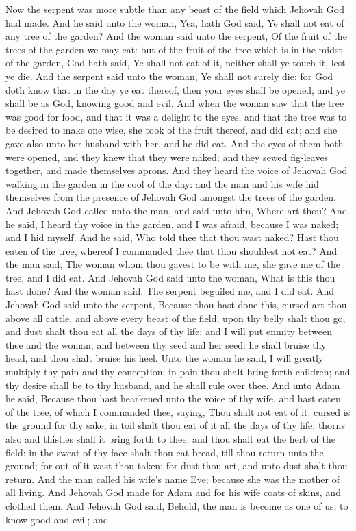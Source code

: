 Now the serpent was more subtle than any beast of the field which Jehovah God had made. And he said unto the woman, Yea, hath God said, Ye shall not eat of any tree of the garden? And the woman said unto the serpent, Of the fruit of the trees of the garden we may eat: but of the fruit of the tree which is in the midst of the garden, God hath said, Ye shall not eat of it, neither shall ye touch it, lest ye die. And the serpent said unto the woman, Ye shall not surely die: for God doth know that in the day ye eat thereof, then your eyes shall be opened, and ye shall be as God, knowing good and evil. And when the woman saw that the tree was good for food, and that it was a delight to the eyes, and that the tree was to be desired to make one wise, she took of the fruit thereof, and did eat; and she gave also unto her husband with her, and he did eat. And the eyes of them both were opened, and they knew that they were naked; and they sewed fig-leaves together, and made themselves aprons. And they heard the voice of Jehovah God walking in the garden in the cool of the day: and the man and his wife hid themselves from the presence of Jehovah God amongst the trees of the garden.  And Jehovah God called unto the man, and said unto him, Where art thou? And he said, I heard thy voice in the garden, and I was afraid, because I was naked; and I hid myself. And he said, Who told thee that thou wast naked? Hast thou eaten of the tree, whereof I commanded thee that thou shouldest not eat? And the man said, The woman whom thou gavest to be with me, she gave me of the tree, and I did eat. And Jehovah God said unto the woman, What is this thou hast done? And the woman said, The serpent beguiled me, and I did eat. And Jehovah God said unto the serpent, Because thou hast done this, cursed art thou above all cattle, and above every beast of the field; upon thy belly shalt thou go, and dust shalt thou eat all the days of thy life: and I will put enmity between thee and the woman, and between thy seed and her seed: he shall bruise thy head, and thou shalt bruise his heel. Unto the woman he said, I will greatly multiply thy pain and thy conception; in pain thou shalt bring forth children; and thy desire shall be to thy husband, and he shall rule over thee. And unto Adam he said, Because thou hast hearkened unto the voice of thy wife, and hast eaten of the tree, of which I commanded thee, saying, Thou shalt not eat of it: cursed is the ground for thy sake; in toil shalt thou eat of it all the days of thy life; thorns also and thistles shall it bring forth to thee; and thou shalt eat the herb of the field; in the sweat of thy face shalt thou eat bread, till thou return unto the ground; for out of it wast thou taken: for dust thou art, and unto dust shalt thou return. And the man called his wife’s name Eve; because she was the mother of all living. And Jehovah God made for Adam and for his wife coats of skins, and clothed them.  And Jehovah God said, Behold, the man is become as one of us, to know good and evil; and 